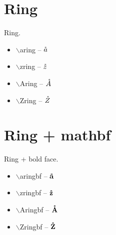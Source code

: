 \documentclass[twocolumn, a4paper]{article}
\begin{document}
	

	


	\section{Ring}
	Ring.
	\begin{itemize} 
		\item $\backslash$aring -- $\mathring{a}$
		\item $\backslash$zring -- $\mathring{z}$  
		\item $\backslash$Aring -- $\mathring{A}$
		\item $\backslash$Zring -- $\mathring{Z}$  
	\end{itemize}

	\section{Ring + mathbf}
	Ring + bold face.
	\begin{itemize} 
		\item $\backslash$aringbf -- $\mathbf{\mathring{a}}$
		\item $\backslash$zringbf -- $\mathbf{\mathring{z}}$  
		\item $\backslash$Aringbf -- $\mathbf{\mathring{A}}$
		\item $\backslash$Zringbf -- $\mathbf{\mathring{Z}}$  
	\end{itemize}
\end{document}
